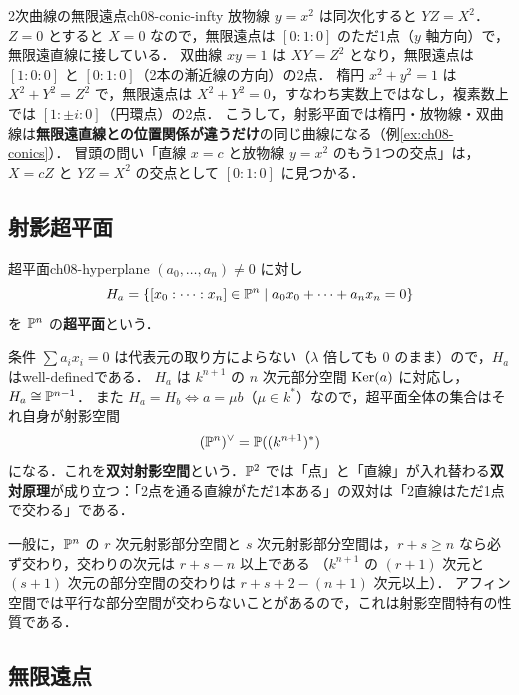 \begin{myex}{2次曲線の無限遠点}{ch08-conic-infty}
放物線 $y=x^2$ は同次化すると $YZ=X^2$．$Z=0$ とすると $X=0$ なので，無限遠点は $[0:1:0]$ のただ1点（$y$ 軸方向）で，無限遠直線に接している．
双曲線 $xy=1$ は $XY=Z^2$ となり，無限遠点は $[1:0:0]$ と $[0:1:0]$（2本の漸近線の方向）の2点．
楕円 $x^2+y^2=1$ は $X^2+Y^2=Z^2$ で，無限遠点は $X^2+Y^2=0$，すなわち実数上ではなし，複素数上では $[1:\pm i:0]$（円環点）の2点．
こうして，射影平面では楕円・放物線・双曲線は\textbf{無限遠直線との位置関係が違うだけ}の同じ曲線になる（例\ref{ex:ch08-conics}）．
冒頭の問い「直線 $x=c$ と放物線 $y=x^2$ のもう1つの交点」は，$X=cZ$ と $YZ=X^2$ の交点として $[0:1:0]$ に見つかる．
\end{myex}

\subsection{射影超平面}

\begin{mydef}{超平面}{ch08-hyperplane}
$(a_0,\dots,a_n)\neq0$ に対し
\[
  H_a=\{[x_0:\dots:x_n]\in\mathbb{P}^n\mid a_0x_0+\cdots+a_nx_n=0\}
\]
を $\mathbb{P}^n$ の\textbf{超平面}という．
\end{mydef}

条件 $\sum a_ix_i=0$ は代表元の取り方によらない（$\lambda$ 倍しても $0$ のまま）ので，$H_a$ はwell-definedである．
$H_a$ は $k^{n+1}$ の $n$ 次元部分空間 $\operatorname{Ker}(a)$ に対応し，$H_a\cong\mathbb{P}^{n-1}$．
また $H_a=H_b\iff a=\mu b$（$\mu\in k^*$）なので，超平面全体の集合はそれ自身が射影空間
\[
  (\mathbb{P}^n)^\vee=\mathbb{P}((k^{n+1})^*)
\]
になる．これを\textbf{双対射影空間}という．$\mathbb{P}^2$ では「点」と「直線」が入れ替わる\textbf{双対原理}が成り立つ：「2点を通る直線がただ1本ある」の双対は「2直線はただ1点で交わる」である．

一般に，$\mathbb{P}^n$ の $r$ 次元射影部分空間と $s$ 次元射影部分空間は，$r+s\ge n$ なら必ず交わり，交わりの次元は $r+s-n$ 以上である
（$k^{n+1}$ の $(r+1)$ 次元と $(s+1)$ 次元の部分空間の交わりは $r+s+2-(n+1)$ 次元以上）．
アフィン空間では平行な部分空間が交わらないことがあるので，これは射影空間特有の性質である．

\subsection{無限遠点}
\label{sec:ch08-infty}


